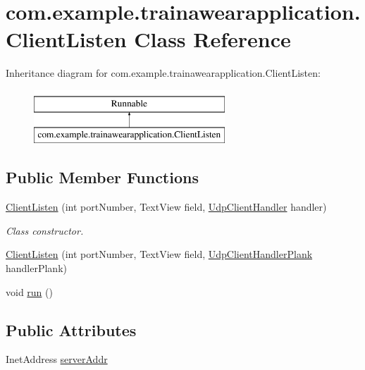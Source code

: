 \hypertarget{classcom_1_1example_1_1trainawearapplication_1_1_client_listen}{}\section{com.\+example.\+trainawearapplication.\+Client\+Listen Class Reference}
\label{classcom_1_1example_1_1trainawearapplication_1_1_client_listen}
Inheritance diagram for com.\+example.\+trainawearapplication.\+Client\+Listen\+:\begin{figure}[H]
\begin{center}
\leavevmode
\includegraphics[height=2.000000cm]{classcom_1_1example_1_1trainawearapplication_1_1_client_listen}
\end{center}
\end{figure}
\subsection*{Public Member Functions}
\begin{DoxyCompactItemize}
\item 
\mbox{\hyperlink{classcom_1_1example_1_1trainawearapplication_1_1_client_listen_a24ac2c031ded11c7a5ce64dae1694253}{Client\+Listen}} (int port\+Number, Text\+View field, \mbox{\hyperlink{classcom_1_1example_1_1trainawearapplication_1_1_udp_client_handler}{Udp\+Client\+Handler}} handler)
\begin{DoxyCompactList}\small\item\em Class constructor. \end{DoxyCompactList}\item 
\mbox{\hyperlink{classcom_1_1example_1_1trainawearapplication_1_1_client_listen_ae0a26fe4b938f8a52e10e6f43665e23c}{Client\+Listen}} (int port\+Number, Text\+View field, \mbox{\hyperlink{classcom_1_1example_1_1trainawearapplication_1_1_udp_client_handler_plank}{Udp\+Client\+Handler\+Plank}} handler\+Plank)
\item 
void \mbox{\hyperlink{classcom_1_1example_1_1trainawearapplication_1_1_client_listen_adcb69d9825d6d9e182905cf9b4aa4d7d}{run}} ()
\end{DoxyCompactItemize}
\subsection*{Public Attributes}
\begin{DoxyCompactItemize}
\item 
Inet\+Address \mbox{\hyperlink{classcom_1_1example_1_1trainawearapplication_1_1_client_listen_abc9e0b9f60e38782a9aa64dde9b43273}{server\+Addr}}
\end{DoxyCompactItemize}
